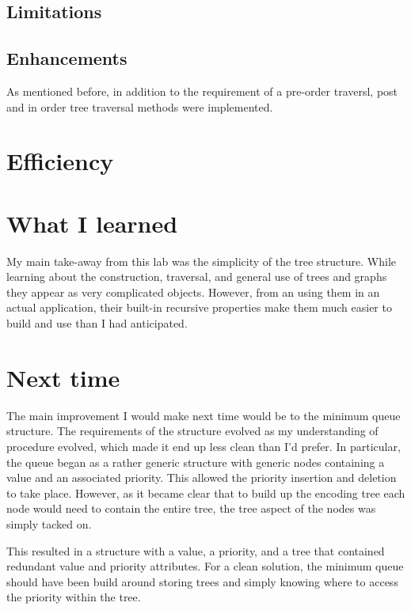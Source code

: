 \documentclass[a4paper,12pt]{article}
\begin{document}
\subsection{Limitations}

\subsection{Enhancements}
As mentioned before, in addition to the requirement of a pre-order traversl, post and in order tree traversal methods were implemented.


\section{Efficiency}


\section{What I learned}
My main take-away from this lab was the simplicity of the tree structure.  While learning about the construction, traversal, and general use of trees and graphs they appear as very complicated objects.  However, from an using them in an actual application, their built-in recursive properties make them much easier to build and use than I had anticipated.


\section{Next time}
The main improvement I would make next time would be to the minimum queue structure.  The requirements of the structure evolved as my understanding of procedure evolved, which made it end up less clean than I'd prefer.  In particular, the queue began as a rather generic structure with generic nodes containing a value and an associated priority.  This allowed the priority insertion and deletion to take place.  However, as it became clear that to build up the encoding tree each node would need to contain the entire tree, the tree aspect of the nodes was simply tacked on.

This resulted in a structure with a value, a priority, and a tree that contained redundant value and priority attributes.  For a clean solution, the minimum queue should have been build around storing trees and simply knowing where to access the priority within the tree.

\end{document}
